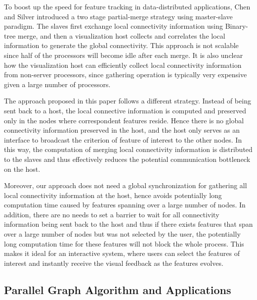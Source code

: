 \documentclass[10pt, conference, compsocconf]{IEEEtran}
\begin{document}
To boost up the speed for feature tracking in data-distributed applications, Chen and Silver \cite{Chen2003} introduced a two stage partial-merge strategy using master-slave paradigm. The slaves first exchange local connectivity information using Binary-tree merge, and then a visualization host collects and correlates the local information to generate the global connectivity. This approach is not scalable since half of the processors will become idle after each merge. It is also unclear how the visualization host can efficiently collect local connectivity information from non-server processors, since gathering operation is typically very expensive given a large number of processors. 

The approach proposed in this paper follows a different strategy. Instead of being sent back to a host, the local connective information is computed and preserved only in the nodes where correspondent features reside. Hence there is no global connectivity information preserved in the host, and the host only serves as an interface to broadcast the criterion of feature of interest to the other nodes. In this way, the computation of merging local connectivity information is distributed to the slaves and thus effectively reduces the potential communication bottleneck on the host.

Moreover, our approach does not need a global synchronization for gathering all local connectivity information at the host, hence avoids potentially long computation time caused by features spanning over a large number of nodes. In addition, there are no needs to set a barrier to wait for all connectivity information being sent back to the host and thus if there exists features that span over a large number of nodes but was not selected by the user, the potentially long computation time for these features will not block the whole process. This makes it ideal for an interactive system, where users can select the features of interest and instantly receive the visual feedback as the features evolves.

\subsection{Parallel Graph Algorithm and Applications}
\end{document}
